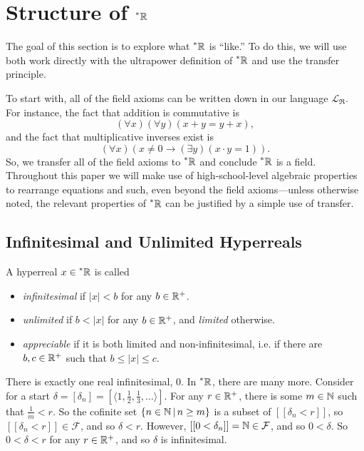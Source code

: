 \section{Structure of \texorpdfstring{$\prescript{*}{}{\mathbb{R}}$}{*R}}\label{sec:StructureOf*R}
The goal of this section is to explore what $\prescript{*}{}{\mathbb{R}}$ is ``like.'' To do this, we will use both work directly with the ultrapower definition of $\prescript{*}{}{\mathbb{R}}$ and use the transfer principle.

To start with, all of the field axioms can be written down in our language $\mathcal{L}_\mathfrak{R}$. For instance, the fact that addition is commutative is
\[ (\forall x)(\forall y)(x + y = y + x), \]
and the fact that multiplicative inverses exist is 
\[ (\forall x)(x \neq 0 \to (\exists y)(x \cdot y = 1)). \]
So, we transfer all of the field axioms to $\prescript{*}{}{\mathbb{R}}$ and conclude $\prescript{*}{}{\mathbb{R}}$ is a field. Throughout this paper we will make use of high-school-level algebraic properties to rearrange equations and such, even beyond the field axioms---unless otherwise noted, the relevant properties of $\prescript{*}{}{\mathbb{R}}$ can be justified by a simple use of transfer.

\subsection{Infinitesimal and Unlimited Hyperreals}

\begin{defn}
    A hyperreal $x \in \prescript{*}{}{\mathbb{R}}$ is called
    \begin{itemize}
        \item \textit{infinitesimal} if $|x| < b$ for any $b \in \mathbb{R}^+$.
        \item \textit{unlimited} if $b < |x|$ for any $b \in \mathbb{R}^+$, and \textit{limited} otherwise.
        \item \textit{appreciable} if it is both limited and non-infinitesimal, i.e. if there are $b, c \in \mathbb{R}^+$ such that $b \leq |x| \leq c$.
    \end{itemize}
\end{defn}

There is exactly one real infinitesimal, $0$. In $\prescript{*}{}{\mathbb{R}}$, there are many more. Consider for a start $\delta = [\delta_n] = [\langle 1, \frac{1}{2}, \frac{1}{3}, \ldots \rangle]$. For any $r \in \mathbb{R}^+$, there is some $m \in \mathbb{N}$ such that $\frac{1}{m} < r$. So the cofinite set $\{n \in \mathbb{N} \,|\, n \geq m\}$ is a subset of $[[\delta_n < r]]$, so $[[\delta_n < r]] \in \mathcal{F}$, and so $\delta < r$. However, $[[0 < \delta_n]] = \mathbb{N} \in \mathcal{F}$, and so $0 < \delta$. So $0 < \delta < r$ for any $r \in \mathbb{R}^+$, and so $\delta$ is infinitesimal.

